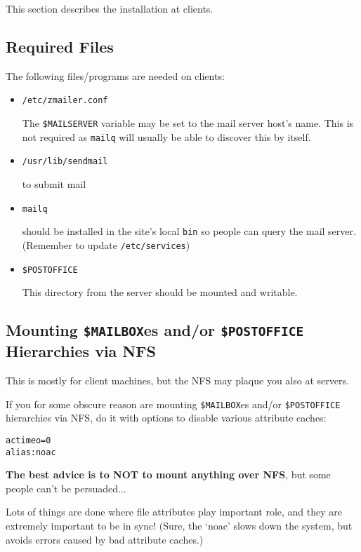 This section describes the installation at clients.


\subsection{Required Files}

The following files/programs are needed on clients:
\begin{itemize}
\item {\tt /etc/zmailer.conf}

The {\tt \$MAILSERVER} variable may be set to the mail server host's name.
This is not required as {\tt mailq} will usually be able to discover this
by itself.

\vspace{1pt}
\item {\tt /usr/lib/sendmail}

to submit mail

\vspace{1pt}
\item {\tt mailq}

should be installed in the site's local {\tt bin} so people
can query the mail server. (Remember to update {\tt /etc/services})

\vspace{1pt}
\item {\tt \$POSTOFFICE}

This directory from the server should be mounted and writable.
\end{itemize}


\subsection{Mounting {\tt \$MAILBOX}es and/or {\tt \$POSTOFFICE} Hierarchies via NFS}

This is mostly for client machines,
but the NFS may plaque you also at servers.

If you for some obscure reason are mounting {\tt \$MAILBOX}es
and/or {\tt \$POSTOFFICE} hierarchies via NFS, do it with
options to disable various attribute caches:
\begin{alltt}
              actimeo=0
    alias:    noac
\end{alltt}

{\bf The best advice is to NOT to mount anything over NFS},
but some people can't be persuaded...

Lots of things are done where file attributes play important
role, and they are extremely important to be in sync!
(Sure, the `noac' slows down the system, but avoids errors
caused by bad attribute caches.)

